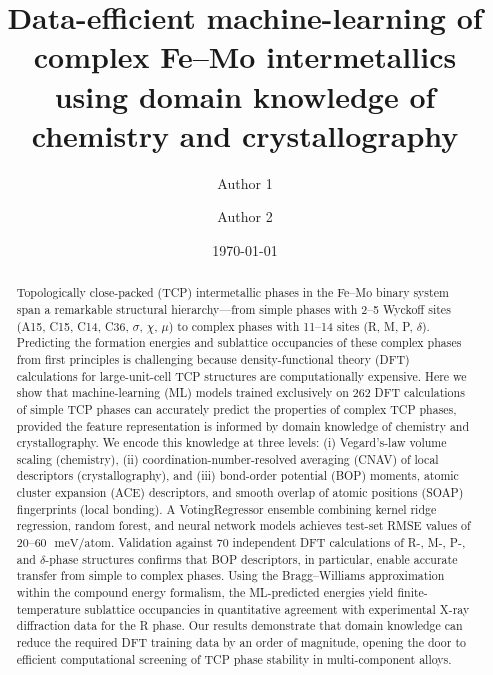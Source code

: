 \documentclass[prb,twocolumn,aps,showpacs,superscriptaddress]{revtex4-2}
\newcommand{\meVat}{\ensuremath{\,\mathrm{meV/atom}}}
\begin{document}
\title{Data-efficient machine-learning of complex Fe--Mo intermetallics \\
        using domain knowledge of chemistry and crystallography}

\author{Author 1}

\author{Author 2}

\date{\today}

\begin{abstract}
Topologically close-packed (TCP) intermetallic phases in the Fe--Mo binary system span a remarkable structural hierarchy---from simple phases with 2--5 Wyckoff sites (A15, C15, C14, C36, $\sigma$, $\chi$, $\mu$) to complex phases with 11--14 sites (R, M, P, $\delta$). Predicting the formation energies and sublattice occupancies of these complex phases from first principles is challenging because density-functional theory (DFT) calculations for large-unit-cell TCP structures are computationally expensive. Here we show that machine-learning (ML) models trained exclusively on 262 DFT calculations of simple TCP phases can accurately predict the properties of complex TCP phases, provided the feature representation is informed by domain knowledge of chemistry and crystallography. We encode this knowledge at three levels: (i) Vegard's-law volume scaling (chemistry), (ii) coordination-number-resolved averaging (CNAV) of local descriptors (crystallography), and (iii) bond-order potential (BOP) moments, atomic cluster expansion (ACE) descriptors, and smooth overlap of atomic positions (SOAP) fingerprints (local bonding). A VotingRegressor ensemble combining kernel ridge regression, random forest, and neural network models achieves test-set RMSE values of 20--60~\meVat. Validation against 70 independent DFT calculations of R-, M-, P-, and $\delta$-phase structures confirms that BOP descriptors, in particular, enable accurate transfer from simple to complex phases. Using the Bragg--Williams approximation within the compound energy formalism, the ML-predicted energies yield finite-temperature sublattice occupancies in quantitative agreement with experimental X-ray diffraction data for the R phase. Our results demonstrate that domain knowledge can reduce the required DFT training data by an order of magnitude, opening the door to efficient computational screening of TCP phase stability in multi-component alloys.
\end{abstract}
\end{document}

